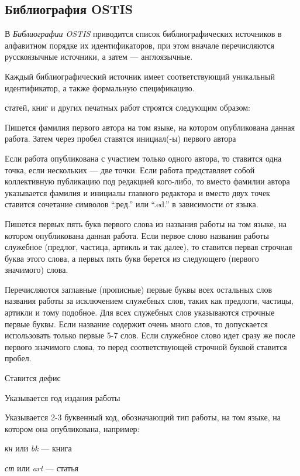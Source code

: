 

\begin{partbacktext}
\part*{Библиография OSTIS}
\label{part_biblio}

В \textit{Библиографии OSTIS} приводится список библиографических источников в алфавитном порядке их идентификаторов, при этом вначале перечисляются русскоязычные источники, а затем --- англоязычные.

Каждый библиографический источник имеет соответствующий уникальный идентификатор, а также формальную спецификацию.

 статей, книг и других печатных работ строятся следующим образом:

\begin{textitemize}
	\item Пишется фамилия первого автора на том языке, на котором опубликована данная работа. Затем через пробел ставятся инициал(-ы) первого автора
	\item Если работа опубликована с участием только одного автора, то ставится одна точка, если нескольких --- две точки. Если работа представляет собой коллективную публикацию под редакцией кого-либо, то вместо фамилии автора указывается фамилия и инициалы главного редактора и вместо двух точек ставится сочетание символов ``.ред.'' или ``.ed.'' в зависимости от языка.
	\item Пишется первых пять букв первого слова из названия работы на том языке, на котором опубликована данная работа. Если первое слово названия работы служебное (предлог, частица, артикль и так далее), то ставится первая строчная буква этого слова, а первых пять букв берется из следующего (первого значимого) слова.
	\item Перечисляются заглавные (прописные) первые буквы всех остальных слов названия работы за исключением служебных слов, таких как предлоги, частицы, артикли и тому подобное. Для всех служебных слов указываются строчные первые буквы. Если название содержит очень много слов, то допускается использовать только первые 5-7 слов. Если служебное слово идет сразу же после первого значимого слова, то перед соответствующей строчной буквой ставится пробел.
	\item Ставится дефис
	\item Указывается год издания работы
	\item Указывается 2-3 буквенный код, обозначающий тип работы, на том языке, на котором она опубликована, например:
	\begin{textitemize}
		\item \textit{кн} или \textit{bk} --- книга
		\item \textit{ст} или \textit{art} --- статья
	\end{textitemize}
\end{textitemize}


\end{partbacktext}
